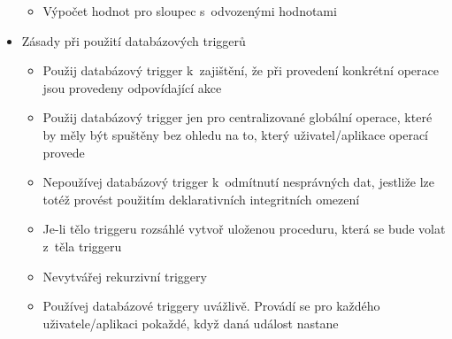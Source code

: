 \documentclass[a4paper,10pt]{article}
\begin{document}
\begin{itemize}
\begin{itemize}
					\item Výpočet hodnot pro sloupec s~odvozenými hodnotami
				\end{itemize}
				\item Zásady při použití databázových triggerů
				\begin{itemize}
					\item Použij databázový trigger k~zajištění, že při provedení konkrétní operace jsou provedeny odpovídající akce
					\item Použij databázový trigger jen pro centralizované globální operace, které by měly být spuštěny bez ohledu na to, který uživatel/aplikace operací provede
					\item Nepoužívej databázový trigger k~odmítnutí nesprávných dat, jestliže lze totéž provést použitím deklarativních integritních omezení
					\item Je-li tělo triggeru rozsáhlé vytvoř uloženou proceduru, která se bude volat z~těla triggeru
					\item Nevytvářej rekurzivní triggery
					\item Používej databázové triggery uvážlivě. Provádí se pro každého uživatele/aplikaci pokaždé, když daná událost nastane
				\end{itemize}				
			\end{itemize}
			
\end{document}
